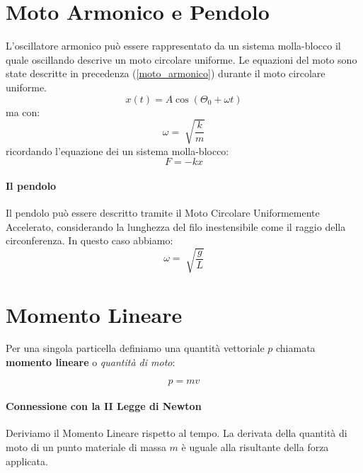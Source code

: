     \section{Moto Armonico e Pendolo} L'oscillatore armonico può essere 
    rappresentato da un sistema molla-blocco il quale oscillando descrive un 
    moto circolare uniforme. Le equazioni del moto sono state descritte in 
    precedenza (\ref{moto_armonico}) durante il moto circolare uniforme. 
        \begin{equation}
            x(t) = A \cos(\Theta_0 + \omega t)
        \end{equation}
        ma con:
        \begin{equation*}
            \omega = \sqrt[]{\frac{k}{m}}
        \end{equation*}
        ricordando l'equazione dei un sistema molla-blocco:
        \begin{equation*}
            F = -kx
        \end{equation*}
        
        \paragraph{Il pendolo} Il pendolo può essere descritto tramite il
        Moto Circolare Uniformemente Accelerato, considerando la lunghezza del 
        filo inestensibile come il raggio della circonferenza. In questo caso 
        abbiamo:
        \begin{equation*}
            \omega = \sqrt[]{\frac{g}{L}}
        \end{equation*}
    
\newpage
    
    \section{Momento Lineare}
    Per una singola particella definiamo una quantità vettoriale $p$ chiamata
    \textbf{momento lineare} o \textit{quantità di moto}: 

        \begin{equation}
            p = mv
        \end{equation}

        \paragraph{Connessione con la II Legge di Newton} Deriviamo il 
        Momento Lineare rispetto al tempo. La derivata della quantità di moto 
        di un punto materiale di massa $m$ è uguale alla risultante della forza 
        applicata.


